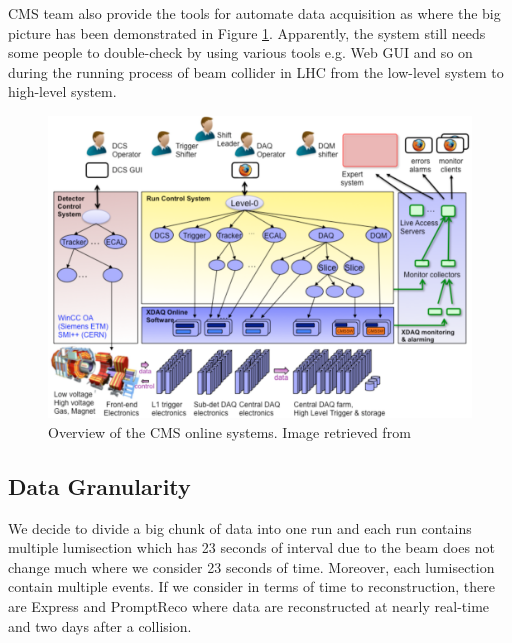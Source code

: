 CMS team also provide the tools for automate data acquisition as \cite{cms_daq} where the big picture has been demonstrated in Figure \ref{fig:cms_online_system}.
Apparently, the system still needs some people to double-check by using various tools e.g. Web GUI and so on during the running process of beam collider in LHC from the low-level system to high-level system.
\begin{figure}[h!]
    \centering
    \includegraphics[width=\textwidth]{images/cms_online_system.png}
    \caption{Overview of the CMS online systems. Image retrieved from \cite{cms_daq}}
    \label{fig:cms_online_system}
\end{figure}

\subsection{Data Granularity}

We decide to divide a big chunk of data into one run and each run contains multiple lumisection which has 23 seconds of interval due to the beam does not change much where we consider 23 seconds of time.
Moreover, each lumisection contain multiple events. If we consider in terms of time to reconstruction, there are Express and PromptReco where data are reconstructed at nearly real-time and two days after a collision.



